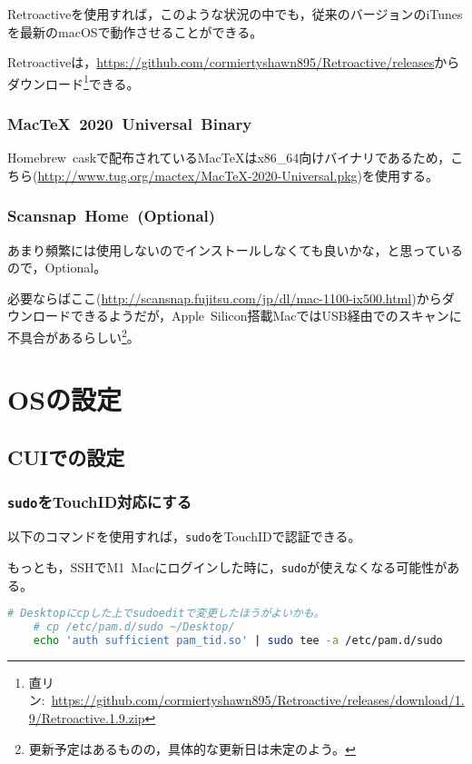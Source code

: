 \documentclass[b5j,titlepage]{ltjsarticle}
\begin{document}
				Retroactiveを使用すれば，このような状況の中でも，従来のバージョンのiTunesを最新のmacOSで動作させることができる。

				Retroactiveは，\protect\url{https://github.com/cormiertyshawn895/Retroactive/releases}からダウンロード\footnote{直リン:\ \protect\url{https://github.com/cormiertyshawn895/Retroactive/releases/download/1.9/Retroactive.1.9.zip}}できる。

			\subsubsection{MacTeX\ 2020\ Universal\ Binary}
				Homebrew\ caskで配布されているMacTeXはx86\_64向けバイナリであるため，こちら(\protect\url{http://www.tug.org/mactex/MacTeX-2020-Universal.pkg})を使用する。

			\subsubsection{Scansnap\ Home\ (Optional)}
				あまり頻繁には使用しないのでインストールしなくても良いかな，と思っているので，Optional。

				必要ならばここ(\protect\url{http://scansnap.fujitsu.com/jp/dl/mac-1100-ix500.html})からダウンロードできるようだが，Apple\ Silicon搭載MacではUSB経由でのスキャンに不具合があるらしい\footnote{更新予定はあるものの，具体的な更新日は未定のよう。}。

	\clearpage

	\section{OSの設定}
		\subsection{CUIでの設定}
			\subsubsection{\texttt{sudo}をTouchID対応にする}
				以下のコマンドを使用すれば，\texttt{sudo}をTouchIDで認証できる。

				もっとも，SSHでM1\ Macにログインした時に，\texttt{sudo}が使えなくなる可能性がある。

				\begin{lstlisting}[language=bash]
	# Desktopにcpした上でsudoeditで変更したほうがよいかも。
	# cp /etc/pam.d/sudo ~/Desktop/
	echo 'auth sufficient pam_tid.so' | sudo tee -a /etc/pam.d/sudo
				\end{lstlisting}
\end{document}
